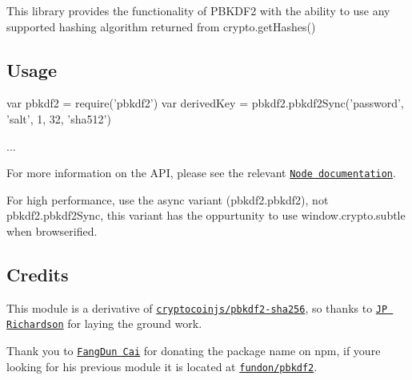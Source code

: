 \href{https://www.npmjs.org/package/pbkdf2}{\tt } \href{https://travis-ci.org/crypto-browserify/pbkdf2}{\tt } \href{https://david-dm.org/crypto-browserify/pbkdf2#info=dependencies}{\tt }

\href{https://github.com/feross/standard}{\tt }

This library provides the functionality of P\+B\+K\+D\+F2 with the ability to use any supported hashing algorithm returned from {\ttfamily crypto.\+get\+Hashes()}

\subsection*{Usage}


\begin{DoxyCode}
var pbkdf2 = require('pbkdf2')
var derivedKey = pbkdf2.pbkdf2Sync('password', 'salt', 1, 32, 'sha512')

...
\end{DoxyCode}


For more information on the A\+PI, please see the relevant \href{https://nodejs.org/api/crypto.html#crypto_crypto_pbkdf2_password_salt_iterations_keylen_digest_callback}{\tt Node documentation}.

For high performance, use the {\ttfamily async} variant ({\ttfamily pbkdf2.\+pbkdf2}), not {\ttfamily pbkdf2.\+pbkdf2\+Sync}, this variant has the oppurtunity to use {\ttfamily window.\+crypto.\+subtle} when browserified.

\subsection*{Credits}

This module is a derivative of \href{https://github.com/cryptocoinjs/pbkdf2-sha256/}{\tt cryptocoinjs/pbkdf2-\/sha256}, so thanks to \href{https://github.com/jprichardson/}{\tt JP Richardson} for laying the ground work.

Thank you to \href{https://github.com/fundon}{\tt Fang\+Dun Cai} for donating the package name on npm, if you\textquotesingle{}re looking for his previous module it is located at \href{https://github.com/fundon/pbkdf2}{\tt fundon/pbkdf2}. 